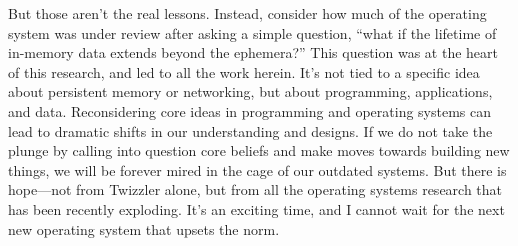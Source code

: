 But those aren't the real lessons. Instead, consider how much of the operating system was under review after asking a
simple question, ``what if the lifetime of in-memory data extends beyond the ephemera?'' This question was at the heart
of this research, and led to all the work herein. It's not tied to a specific idea about persistent
memory or networking, but about programming, applications, and
data. Reconsidering core ideas in programming and operating systems can lead to dramatic shifts in our understanding and
designs. If we do not take the plunge by calling into question core beliefs and make moves towards building new things,
we will be forever mired in the cage of our outdated systems. But there is hope---not from Twizzler alone, but from all
the operating systems research that has been recently exploding. It's an exciting time, and I cannot wait for the next
new operating system that upsets the norm.

